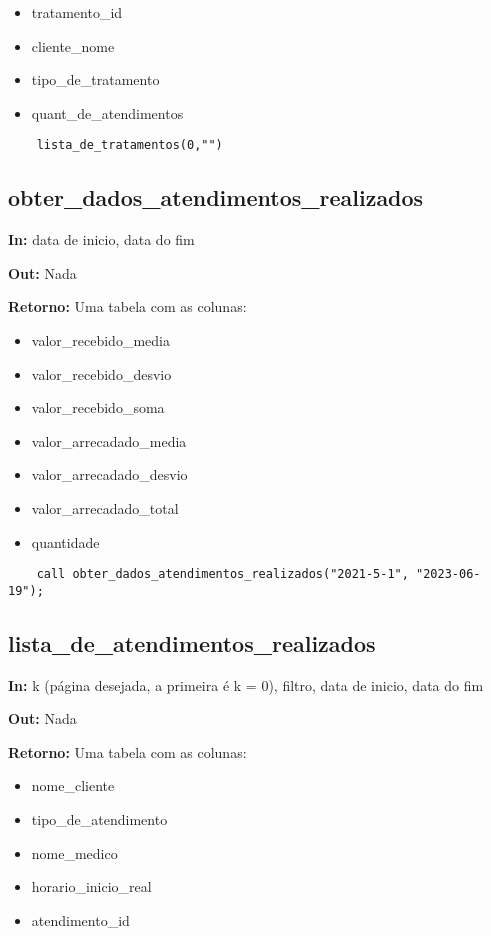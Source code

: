 \begin{itemize}
	\item tratamento\_id
	\item cliente\_nome
	\item tipo\_de\_tratamento
	\item quant\_de\_atendimentos
\end{itemize}

\begin{verbatim}
	lista_de_tratamentos(0,"")
\end{verbatim}

\subsection{obter\_dados\_atendimentos\_realizados}
\textbf{In:} data de inicio, data do fim

\textbf{Out:} Nada

\textbf{Retorno:} Uma tabela com as colunas:

\begin{itemize}
	\item valor\_recebido\_media
	\item valor\_recebido\_desvio
	\item valor\_recebido\_soma
	\item valor\_arrecadado\_media
	\item valor\_arrecadado\_desvio
	\item valor\_arrecadado\_total
	\item quantidade
\end{itemize}

\begin{verbatim}
	call obter_dados_atendimentos_realizados("2021-5-1", "2023-06-19");
\end{verbatim}

\subsection{lista\_de\_atendimentos\_realizados}

\textbf{In:} k (página desejada, a primeira é k = 0), filtro, data de inicio, data do fim

\textbf{Out:} Nada

\textbf{Retorno:} Uma tabela com as colunas:

\begin{itemize}
	\item nome\_cliente
	\item tipo\_de\_atendimento
	\item nome\_medico
	\item horario\_inicio\_real
	\item atendimento\_id
\end{itemize}

